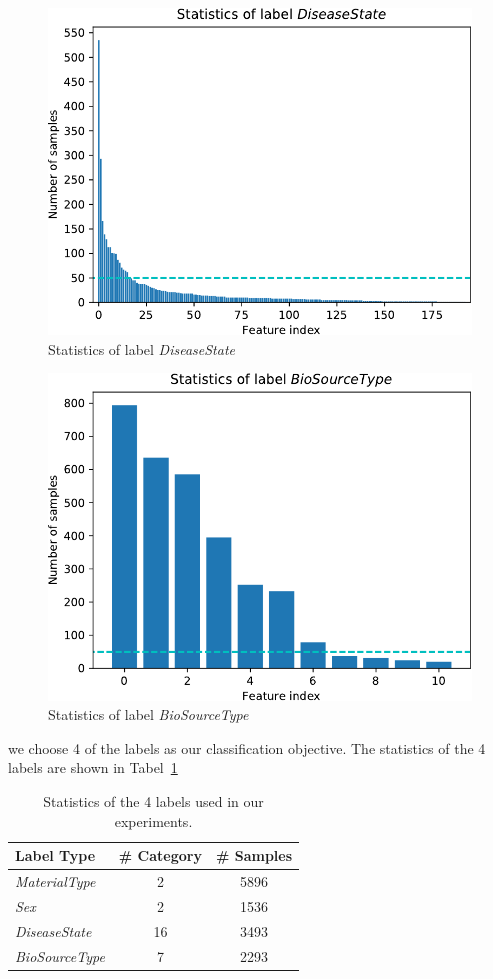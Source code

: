 \documentclass[sigconf]{acmart}
\begin{document}
	\begin{figure}[h]
	\centering
	\includegraphics[width=0.8\linewidth]{../figs/Stat_DiseaseState}
	\caption{Statistics of label \textit{DiseaseState}}
	\label{fig:Stat_DiseaseState}
	\end{figure}
	
	\begin{figure}[h]
	\centering
	\includegraphics[width=0.8\linewidth]{../figs/Stat_BioSourceType}
	\caption{Statistics of label \textit{BioSourceType}}
	\label{fig:Stat_BioSourceType}
	\end{figure}
	
	
	we choose 4 of the labels as our classification objective. The statistics of the 4 labels are shown in Tabel~\ref{tab:label}
	\begin{table}[tbp]
		\centering
		\begin{tabular}{l|cc}
			\toprule
			{Label Type} & \# Category & \# Samples \\
			\midrule
			{\textit{MaterialType}}& 2 & 5896 \\
			{\textit{Sex}}		& 2 & 1536     \\
			{\textit{DiseaseState}}& 16 & 3493 \\
			{\textit{BioSourceType}}& 7 & 2293 \\
			\bottomrule	
		\end{tabular}
		\caption{ Statistics of the 4 labels used in our experiments. }
		\label{tab:label}
	\end{table}
	
\end{document}
